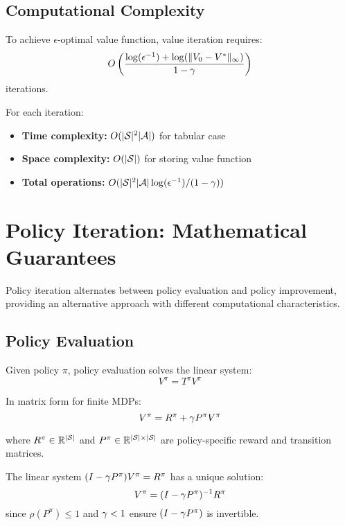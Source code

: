 \subsection{Computational Complexity}

\begin{theorem}
To achieve $\epsilon$-optimal value function, value iteration requires:
\begin{equation}
O\left(\frac{\log(\epsilon^{-1}) + \log(\|V_0 - V^*\|_\infty)}{1 - \gamma}\right)
\end{equation}
iterations.
\end{theorem}

For each iteration:
\begin{itemize}
    \item \textbf{Time complexity:} $O(|\mathcal{S}|^2 |\mathcal{A}|)$ for tabular case
    \item \textbf{Space complexity:} $O(|\mathcal{S}|)$ for storing value function
    \item \textbf{Total operations:} $O(|\mathcal{S}|^2 |\mathcal{A}| \log(\epsilon^{-1}) / (1-\gamma))$
\end{itemize}

\section{Policy Iteration: Mathematical Guarantees}

Policy iteration alternates between policy evaluation and policy improvement, providing an alternative approach with different computational characteristics.

\subsection{Policy Evaluation}

Given policy $\pi$, policy evaluation solves the linear system:
\begin{equation}
V^\pi = T^\pi V^\pi
\end{equation}

In matrix form for finite MDPs:
\begin{equation}
V^\pi = R^\pi + \gamma P^\pi V^\pi
\end{equation}

where $R^\pi \in \mathbb{R}^{|\mathcal{S}|}$ and $P^\pi \in \mathbb{R}^{|\mathcal{S}| \times |\mathcal{S}|}$ are policy-specific reward and transition matrices.

\begin{theorem}
The linear system $(I - \gamma P^\pi) V^\pi = R^\pi$ has a unique solution:
\begin{equation}
V^\pi = (I - \gamma P^\pi)^{-1} R^\pi
\end{equation}
since $\rho(P^\pi) \leq 1$ and $\gamma < 1$ ensure $(I - \gamma P^\pi)$ is invertible.
\end{theorem}

